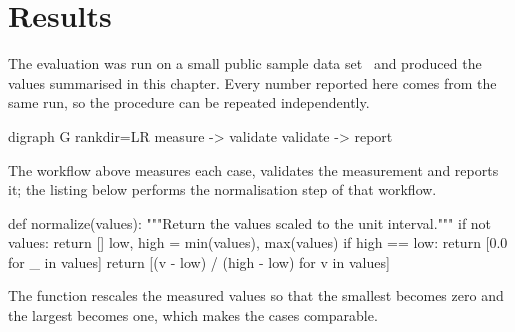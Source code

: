\chapter{Results}
\label{ch:results}

The evaluation was run on a small public sample data set~\cite{openlab2024}
and produced the values summarised in this chapter. Every number reported
here comes from the same run, so the procedure can be repeated
independently.

\begin{graphviz}[style=editorial, width=0.8\linewidth, pos=H, caption={Measurement workflow}]
  digraph G {
    rankdir=LR
    measure -> validate
    validate -> report
  }
\end{graphviz}

The workflow above measures each case, validates the measurement and
reports it; the listing below performs the normalisation step of that
workflow.

\begin{code}[lang=python, numbers=true]
def normalize(values):
    """Return the values scaled to the unit interval."""
    if not values:
        return []
    low, high = min(values), max(values)
    if high == low:
        return [0.0 for _ in values]
    return [(v - low) / (high - low) for v in values]
\end{code}

The function rescales the measured values so that the smallest becomes zero
and the largest becomes one, which makes the cases comparable.
